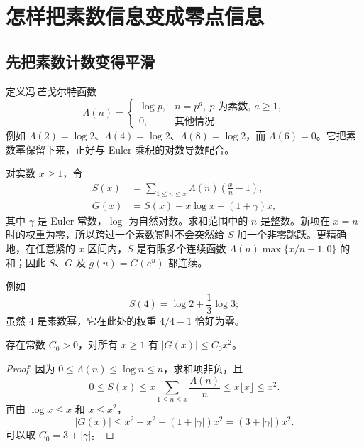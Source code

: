 \chapter{怎样把素数信息变成零点信息}
\label{chap:bridge}
\section{先把素数计数变得平滑}
定义冯\,芒戈尔特函数
\[
\Lambda(n)=
\begin{cases}
\log p,&n=p^a,\ p\text{ 为素数},\ a\ge1,\\
0,&\text{其他情况}.
\end{cases}
\]
例如 $\Lambda(2)=\log2$、$\Lambda(4)=\log2$、$\Lambda(8)=\log2$，而 $\Lambda(6)=0$。它把素数幂保留下来，正好与 Euler 乘积的对数导数配合。

对实数 $x\ge1$，令
\begin{align}
S(x)&=\sum_{1\le n\le x}\Lambda(n)\left(\frac{x}{n}-1\right),\label{eq:S}\\
G(x)&=S(x)-x\log x+(1+\gamma)x,\label{eq:G}
\end{align}
其中 $\gamma$ 是 Euler 常数，$\log$ 为自然对数。求和范围中的 $n$ 是整数。新项在 $x=n$ 时的权重为零，所以跨过一个素数幂时不会突然给 $S$ 加一个非零跳跃。更精确地，在任意紧的 $x$ 区间内，$S$ 是有限多个连续函数 $\Lambda(n)\max\{x/n-1,0\}$ 的和；因此 $S$、$G$ 及 $g(u)=G(e^u)$ 都连续。

例如
\[
S(4)=\log2+\frac13\log3;
\]
虽然 $4$ 是素数幂，它在此处的权重 $4/4-1$ 恰好为零。


\begin{lemma}[无需 RH 的粗增长界]
\label{lem:growth}
存在常数 $C_0>0$，对所有 $x\ge1$ 有 $|G(x)|\le C_0x^2$。
\end{lemma}
\begin{proof}
因为 $0\le\Lambda(n)\le\log n\le n$，求和项非负，且
\[
0\le S(x)\le x\sum_{1\le n\le x}\frac{\Lambda(n)}n
\le x\lfloor x\rfloor\le x^2.
\]
再由 $\log x\le x$ 和 $x\le x^2$，
\[
|G(x)|\le x^2+x^2+(1+|\gamma|)x^2
=(3+|\gamma|)x^2.
\]
可以取 $C_0=3+|\gamma|$。
\end{proof}

